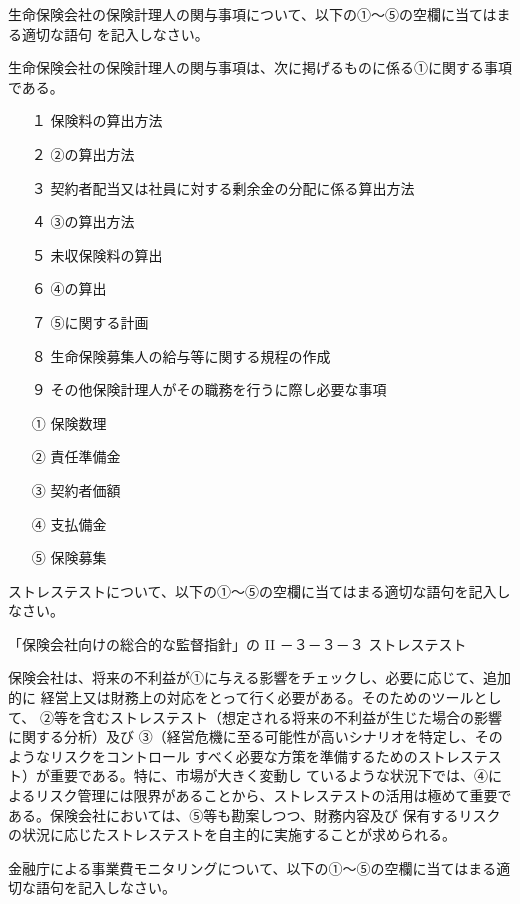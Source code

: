 \documentclass[report,gutter=10mm,fore-edge=10mm,uplatex,dvipdfmx]{jlreq}
\begin{document}

生命保険会社の保険計理人の関与事項について、以下の①～⑤の空欄に当てはまる適切な語句
を記入しなさい。

生命保険会社の保険計理人の関与事項は、次に掲げるものに係る①に関する事項である。

\begin{itemize}
\item[ １]  保険料の算出方法
\item[ ２]  ②の算出方法
\item[ ３]  契約者配当又は社員に対する剰余金の分配に係る算出方法
\item[ ４]  ③の算出方法
\item[ ５]  未収保険料の算出
\item[ ６]  ④の算出
\item[ ７]  ⑤に関する計画
\item[ ８]  生命保険募集人の給与等に関する規程の作成
\item[ ９]  その他保険計理人がその職務を行うに際し必要な事項
\end{itemize}
\answer{}
\begin{itemize}
\item[ ① ] 保険数理
\item[ ② ] 責任準備金
\item[ ③ ] 契約者価額
\item[ ④ ] 支払備金
\item[ ⑤ ] 保険募集
\end{itemize}
ストレステストについて、以下の①〜⑤の空欄に当てはまる適切な語句を記入しなさい。

「保険会社向けの総合的な監督指針」の II －３－３－３ ストレステスト

保険会社は、将来の不利益が①に与える影響をチェックし、必要に応じて、追加的に
経営上又は財務上の対応をとって行く必要がある。そのためのツールとして、
②等を含むストレステスト（想定される将来の不利益が生じた場合の影響に関する分析）及び
③（経営危機に至る可能性が高いシナリオを特定し、そのようなリスクをコントロール
すべく必要な方策を準備するためのストレステスト）が重要である。特に、市場が大きく変動し
ているような状況下では、④によるリスク管理には限界があることから、ストレステストの活用は極めて重要である。保険会社においては、⑤等も勘案しつつ、財務内容及び
保有するリスクの状況に応じたストレステストを自主的に実施することが求められる。

金融庁による事業費モニタリングについて、以下の①〜⑤の空欄に当てはまる適切な語句を記入しなさい。
\end{document}
